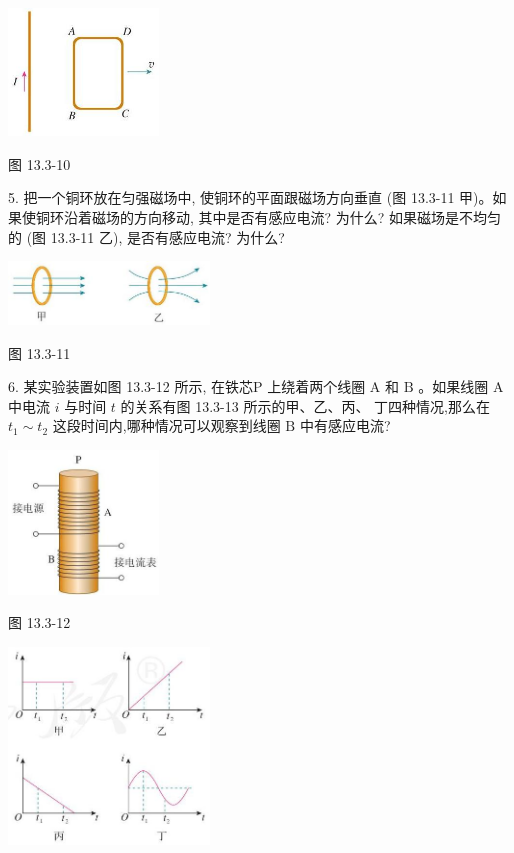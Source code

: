 \documentclass[10pt]{article}
\begin{document}
\begin{center}
\includegraphics[max width=0.3\textwidth]{images/01911d5f-8e38-70c0-b5b8-2b399bd115b6_123_221542.jpg}
\end{center}

图 13.3-10

5. 把一个铜环放在匀强磁场中, 使铜环的平面跟磁场方向垂直 (图 13.3-11 甲)。如果使铜环沿着磁场的方向移动, 其中是否有感应电流? 为什么? 如果磁场是不均匀的 (图 13.3-11 乙), 是否有感应电流? 为什么?

\begin{center}
\includegraphics[max width=0.4\textwidth]{images/01911d5f-8e38-70c0-b5b8-2b399bd115b6_123_715516.jpg}
\end{center}

图 13.3-11

6. 某实验装置如图 13.3-12 所示, 在铁芯P 上绕着两个线圈 \(\mathrm{A}\) 和 \(\mathrm{B}\) 。如果线圈 \(\mathrm{A}\) 中电流 \(i\) 与时间 \(t\) 的关系有图 13.3-13 所示的甲、乙、丙、 丁四种情况,那么在 \({t}_{1} \sim {t}_{2}\) 这段时间内,哪种情况可以观察到线圈 \(\mathrm{B}\) 中有感应电流?

\begin{center}
\includegraphics[max width=0.3\textwidth]{images/01911d5f-8e38-70c0-b5b8-2b399bd115b6_123_375898.jpg}
\end{center}

图 13.3-12

\begin{center}
\includegraphics[max width=0.4\textwidth]{images/01911d5f-8e38-70c0-b5b8-2b399bd115b6_123_984662.jpg}
\end{center}
\end{document}
